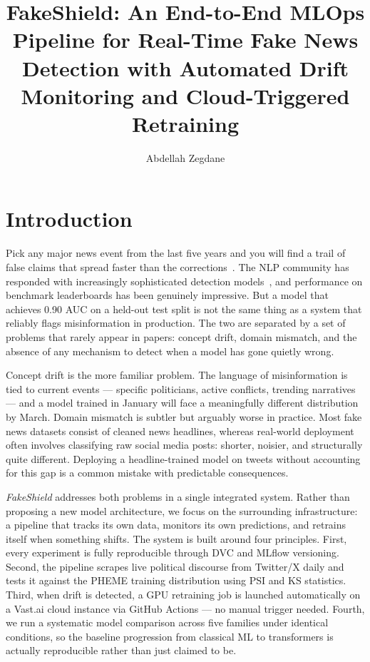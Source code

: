 \documentclass[sigconf]{acmart}
\title{FakeShield: An End-to-End MLOps Pipeline for Real-Time Fake News Detection with Automated Drift Monitoring and Cloud-Triggered Retraining}
\author{Abdellah Zegdane}
\affiliation{%
  \institution{Isik University}
  \department{Computer Science Engineering}
  \city{Istanbul}
  \country{Turkey}
}
\begin{document}
\maketitle

\section{Introduction}

Pick any major news event from the last five years and you will find a trail of false
claims that spread faster than the corrections~\cite{vosoughi2018spread}. The NLP community
has responded with increasingly sophisticated detection models~\cite{zhou2020survey}, and
performance on benchmark leaderboards has been genuinely impressive. But a model that achieves
0.90 AUC on a held-out test split is not the same thing as a system that reliably flags
misinformation in production. The two are separated by a set of problems that rarely appear
in papers: concept drift, domain mismatch, and the absence of any mechanism to detect when
a model has gone quietly wrong.

Concept drift is the more familiar problem. The language of misinformation is tied to current
events — specific politicians, active conflicts, trending narratives — and a model trained
in January will face a meaningfully different distribution by March. Domain mismatch is subtler
but arguably worse in practice. Most fake news datasets consist of cleaned news headlines,
whereas real-world deployment often involves classifying raw social media posts: shorter, noisier,
and structurally quite different. Deploying a headline-trained model on tweets without
accounting for this gap is a common mistake with predictable consequences.

\textit{FakeShield} addresses both problems in a single integrated system. Rather than
proposing a new model architecture, we focus on the surrounding infrastructure: a pipeline
that tracks its own data, monitors its own predictions, and retrains itself when something
shifts. The system is built around four principles. First, every experiment is fully
reproducible through DVC and MLflow versioning. Second, the pipeline scrapes live political
discourse from Twitter/X daily and tests it against the PHEME training distribution using
PSI and KS statistics. Third, when drift is detected, a GPU retraining job is launched
automatically on a Vast.ai cloud instance via GitHub Actions — no manual trigger needed.
Fourth, we run a systematic model comparison across five families under identical conditions,
so the baseline progression from classical ML to transformers is actually reproducible
rather than just claimed to be.
\end{document}
